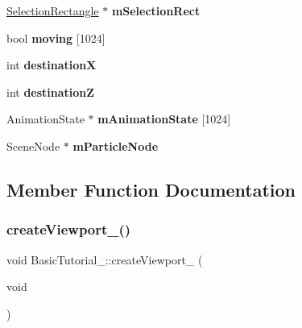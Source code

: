 \begin{DoxyCompactItemize}
\item 
\mbox{\label{class_basic_tutorial__00_a150d8d4f2c6b988993e75abf906d4316}} 
\hyperlink{class_selection_rectangle}{Selection\+Rectangle} $\ast$ {\bfseries m\+Selection\+Rect}
\item 
\mbox{\label{class_basic_tutorial__00_a3a08fc638a456ce211ee722f407d15f2}} 
bool {\bfseries moving} \mbox{[}1024\mbox{]}
\item 
\mbox{\label{class_basic_tutorial__00_a539c8feec3d6cdf22c42e0ae0014e31b}} 
int {\bfseries destinationX}
\item 
\mbox{\label{class_basic_tutorial__00_acda33de784bd221b9585d40c718b2c7b}} 
int {\bfseries destinationZ}
\item 
\mbox{\label{class_basic_tutorial__00_ae926589a08a6251fad6c0736c7c405b3}} 
Animation\+State $\ast$ {\bfseries m\+Animation\+State} \mbox{[}1024\mbox{]}
\item 
\mbox{\label{class_basic_tutorial__00_aed15b815e3bc5f0769b6dc7a7e0c4ba4}} 
Scene\+Node $\ast$ {\bfseries m\+Particle\+Node}
\end{DoxyCompactItemize}


\subsection{Member Function Documentation}
\mbox{\label{class_basic_tutorial__00_a6d4684502f2f7b2cf628a975d7750d8e}} 
\subsubsection{\texorpdfstring{create\+Viewport\+\_()}{createViewport\_00()}}
{\footnotesize\ttfamily void Basic\+Tutorial\+\_\+::create\+Viewport\+\_ (\begin{DoxyParamCaption}\item[{void}]{ }\end{DoxyParamCaption})\hspace{0.3cm}{\ttfamily [protected]}}



